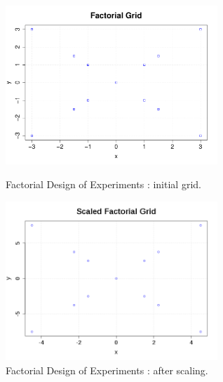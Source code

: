              \begin{figure}[H]
               \begin{minipage}{10cm}
                 \begin{center}
                   \includegraphics[width=8cm]{Figures/FactorialGrid.pdf}
                   \caption{Factorial Design of Experiments  : initial grid.}
                   \label{FactorialGrid}
                 \end{center}
               \end{minipage}
               \hfill
               \begin{minipage}{10cm}
                 \begin{center}
                   \includegraphics[width=8cm]{Figures/ScaledFactorialGrid.png}
                   \caption{Factorial Design of Experiments  : after scaling.}
                   \label{ScaledFactorialGrid}
                 \end{center}
               \end{minipage}
             \end{figure}




